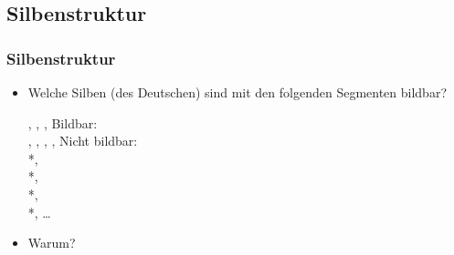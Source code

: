 \subsection{Silbenstruktur}
%
\begin{frame}
\frametitle{Silbenstruktur}

\begin{itemize}
	\item Welche Silben (des Deutschen) sind mit den folgenden Segmenten bildbar?
	
	  \ea
          \textipa{[p]}, \textipa{[a]}, \textipa{[l]}, \textipa{[t]}
          \z
\pause	
\eal
\ex Bildbar:\\
	\textipa{[palt]}, \textipa{[alpt]}, \textipa{[lapt]}, \textipa{[talp]}, \textipa{[plat]}
\ex Nicht bildbar:\\
	*\textipa{[ltap]}, \\
	*\textipa{[lpat]},\\
	*\textipa{[ptla]}, \\
	*\textipa{[tpal]}, \dots \\
\zl
\pause
	\item Warum?
\end{itemize}

\end{frame}




